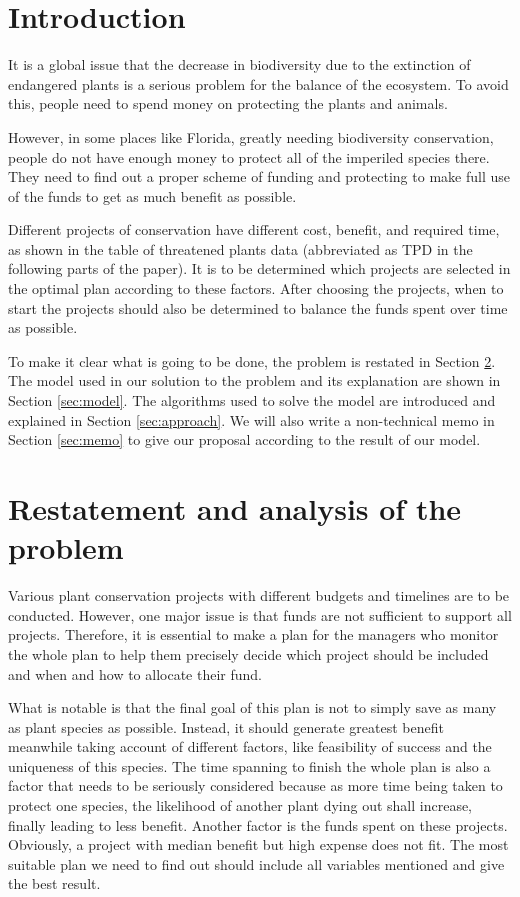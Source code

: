 \documentclass{article}
\begin{document}
\newpage
\section{Introduction}
\label{sec:intro}

It is a global issue that the decrease in biodiversity due to the extinction of endangered plants is a serious problem for the balance of the ecosystem.
To avoid this, people need to spend money on protecting the plants and animals.

However, in some places like Florida, greatly needing biodiversity conservation,
people do not have enough money to protect all of the imperiled species there.
They need to find out a proper scheme of funding and protecting to make full use of the funds to get as much benefit as possible.

Different projects of conservation have different cost, benefit, and required time,
as shown in the table of threatened plants data (abbreviated as TPD in the following parts of the paper).
It is to be determined which projects are selected in the optimal plan according to these factors.
After choosing the projects, when to start the projects should also be determined to balance the funds spent over time as possible.

To make it clear what is going to be done, the problem is restated in Section \ref{sec:restatement}.
The model used in our solution to the problem and its explanation are shown in Section \ref{sec:model}.
The algorithms used to solve the model are introduced and explained in Section \ref{sec:approach}.
We will also write a non-technical memo in Section \ref{sec:memo} to give our proposal according to the result of our model.

\section{Restatement and analysis of the problem}
\label{sec:restatement}

Various plant conservation projects with different budgets and timelines are to be conducted.
However, one major issue is that funds are not sufficient to support all projects.
Therefore, it is essential to make a plan for the managers who monitor the whole plan to help them precisely decide which project should be included and when and how to allocate their fund.

What is notable is that the final goal of this plan is not to simply save as many as plant species as possible.
Instead, it should generate greatest benefit meanwhile taking account of different factors, like feasibility of success and the uniqueness of this species.
The time spanning to finish the whole plan is also a factor that needs to be seriously considered because as more time being taken to protect one species, the likelihood of another plant dying out shall increase, finally leading to less benefit.
Another factor is the funds spent on these projects.
Obviously, a project with median benefit but high expense does not fit.
The most suitable plan we need to find out should include all variables mentioned and give the best result.
\end{document}
